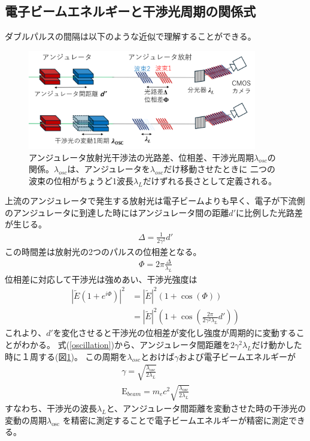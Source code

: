 \documentclass[a4paper,11pt,uplatex]{jsbook}
\begin{document}
\subsection{電子ビームエネルギーと干渉光周期の関係式}\label{sec:interference}
ダブルパルスの間隔は以下のような近似で理解することができる。
\begin{figure}[H]
  \centering
  \includegraphics[width=10cm]{image/2-lambdaosc.png}
  \caption[干渉項の振動周期]{アンジュレータ放射光干渉法の光路差、位相差、干渉光周期$\lambda_{osc}$の関係。$\lambda_{osc}$は、アンジュレータを$\lambda_{osc}$だけ移動させたときに
  二つの波束の位相がちょうど1波長$\lambda_L$だけずれる長さとして定義される。}\label{fig:lambda_osc}
\end{figure}
上流のアンジュレータで発生する放射光は電子ビームよりも早く、電子が下流側のアンジュレータに到達した時にはアンジュレータ間の距離$d'$に比例した光路差が生じる。
\begin{eqnarray}
  \Delta = \frac{1}{2\gamma^2}d' \label{path shift}
\end{eqnarray}
この時間差は放射光の2つのパルスの位相差となる。
\begin{eqnarray}
  \Phi = 2\pi \frac{\Delta}{\lambda_L}
\end{eqnarray}
位相差に対応して干渉光は強めあい、干渉光強度は
\begin{eqnarray}
  |\tilde{E} \left( 1+ e^{i\Phi}\right)|^2 
&= |\tilde{E}|^2 \left( 1 + \cos(\Phi) \right)\\
&= |\tilde{E}|^2 \left( 1 + \cos(\frac{2\pi}{2\gamma^2\lambda_L}d') \right) 
  \label{oscillation}
\end{eqnarray}
これより、$d'$を変化させると干渉光の位相差が変化し強度が周期的に変動することがわかる。
式(\ref{oscillation})から、アンジュレータ間距離を$2\gamma^2\lambda_L$だけ動かした時に１周する(図\ref{fig:lambda_osc})。
この周期を$\lambda_{osc}$とおけば$\gamma$および電子ビームエネルギーが
\begin{eqnarray}
  \gamma = \sqrt{\frac{\lambda_{\text{osc}}}{2\lambda_L}}\\
  \text{E}_{beam} =m_e c^2  \sqrt{\frac{\lambda_{\text{osc}}}{2\lambda_L}} \label{zero order energy formula}
\end{eqnarray}
すなわち、干渉光の波長$\lambda_L$と、アンジュレータ間距離を変動させた時の干渉光の変動の周期$\lambda_{\text{osc}}$
を精密に測定することで電子ビームエネルギーが精密に測定できる。
\end{document}
